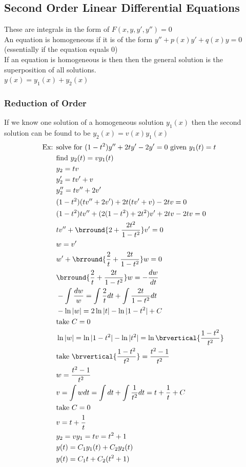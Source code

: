 \subsection{Second Order Linear Differential Equations}
These are integrals in the form of $F(x,y,y',y'')=0$\\
An equation is homogeneous if it is of the form $y''+p(x)y'+q(x)y=0$ (essentially if the equation equals 0)\\
If an equation is homogeneous is then then the general solution is the superposition of all solutions.\\
$y(x)=y_1(x)+y_2(x)$
\subsubsection{Reduction of Order}
If we know one solution of a homogeneous solution $y_1(x)$ then the second solution can be found to be $y_2(x)=v(x)y_1(x)$
\begin{align*}
    \text{Ex: }&\text{solve for }(1-t^2)y''+2ty'-2y'=0\ \text{given }y_1(t)=t\\
    &\text{find }y_2(t)=vy_1(t)\\
    &y_2=tv\\
    &y_2'=tv'+v\\
    &y_2''=tv''+2v'\\
    &(1-t^2)(tv''+2v')+2t(tv'+v)-2tv=0\\
    &(1-t^2)tv''+(2(1-t^2)+2t^2)v'+2tv-2tv=0\\
    &tv''+\brround{2+\frac{2t^2}{1-t^2}}v'=0\\
    &w=v'\\
    &w'+\brround{\frac{2}{t}+\frac{2t}{1-t^2}}w=0\\
    &\brround{\frac{2}{t}+\frac{2t}{1-t^2}}w=-\frac{dw}{dt}\\
    &-\int\frac{dw}{w}=\int\frac{2}{t}dt+\int\frac{2t}{1-t^2}dt\\
    &-\ln|w|=2\ln|t|-\ln|1-t^2|+C\\
    &\text{take }C=0\\
    &\ln|w|=\ln|1-t^2|-\ln|t^2|=\ln\brvertical{\frac{1-t^2}{t^2}}\\
    &\text{take }\brvertical{\frac{1-t^2}{t^2}}=\frac{t^2-1}{t^2}\\
    &w=\frac{t^2-1}{t^2}\\
    &v=\int wdt=\int dt+\int\frac{1}{t^2}dt=t+\frac{1}{t}+C\\
    &\text{take }C=0\\
    &v=t+\frac{1}{t}\\
    &y_2=vy_1=tv=t^2+1\\
    &y(t)=C_1y_1(t)+C_2y_2(t)\\
    &y(t)=C_1t+C_2(t^2+1)
\end{align*}
